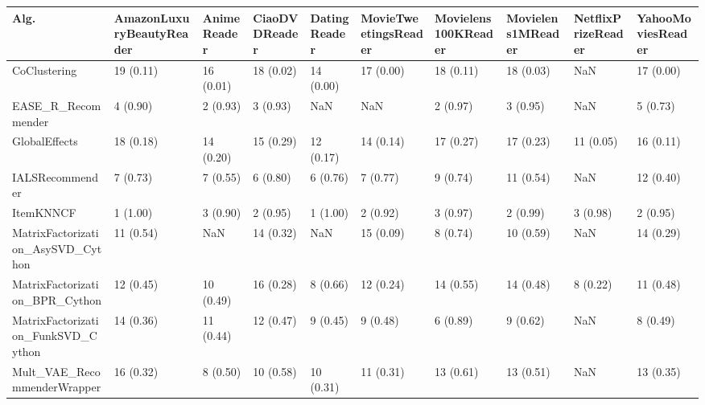 \begin{tabular}{llllllllll}
\toprule
                               Alg. & AmazonLuxuryBeautyReader & AnimeReader & CiaoDVDReader & DatingReader & MovieTweetingsReader & Movielens100KReader & Movielens1MReader & NetflixPrizeReader & YahooMoviesReader \\
\midrule
                       CoClustering &                19 (0.11) &   16 (0.01) &     18 (0.02) &    14 (0.00) &            17 (0.00) &           18 (0.11) &         18 (0.03) &                NaN &         17 (0.00) \\
                 EASE\_R\_Recommender &                 4 (0.90) &    2 (0.93) &      3 (0.93) &          NaN &                  NaN &            2 (0.97) &          3 (0.95) &                NaN &          5 (0.73) \\
                      GlobalEffects &                18 (0.18) &   14 (0.20) &     15 (0.29) &    12 (0.17) &            14 (0.14) &           17 (0.27) &         17 (0.23) &          11 (0.05) &         16 (0.11) \\
                    IALSRecommender &                 7 (0.73) &    7 (0.55) &      6 (0.80) &     6 (0.76) &             7 (0.77) &            9 (0.74) &         11 (0.54) &                NaN &         12 (0.40) \\
                          ItemKNNCF &                 1 (1.00) &    3 (0.90) &      2 (0.95) &     1 (1.00) &             2 (0.92) &            3 (0.97) &          2 (0.99) &           3 (0.98) &          2 (0.95) \\
  MatrixFactorization\_AsySVD\_Cython &                11 (0.54) &         NaN &     14 (0.32) &          NaN &            15 (0.09) &            8 (0.74) &         10 (0.59) &                NaN &         14 (0.29) \\
     MatrixFactorization\_BPR\_Cython &                12 (0.45) &   10 (0.49) &     16 (0.28) &     8 (0.66) &            12 (0.24) &           14 (0.55) &         14 (0.48) &           8 (0.22) &         11 (0.48) \\
 MatrixFactorization\_FunkSVD\_Cython &                14 (0.36) &   11 (0.44) &     12 (0.47) &     9 (0.45) &             9 (0.48) &            6 (0.89) &          9 (0.62) &                NaN &          8 (0.49) \\
        Mult\_VAE\_RecommenderWrapper &                16 (0.32) &    8 (0.50) &     10 (0.58) &    10 (0.31) &            11 (0.31) &           13 (0.61) &         13 (0.51) &                NaN &         13 (0.35) \\

\end{tabular}
